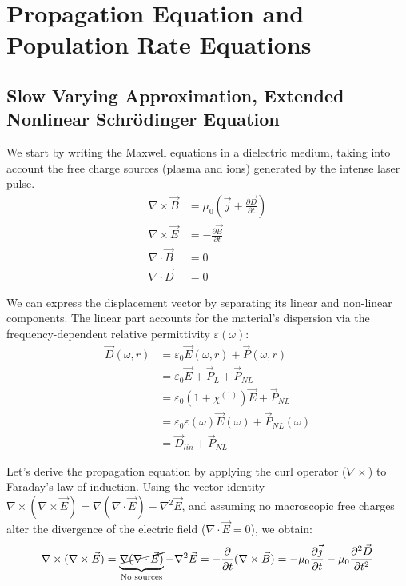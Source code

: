 \section{Propagation Equation and Population Rate Equations}
\subsection{Slow Varying Approximation, Extended Nonlinear Schrödinger Equation}

We start by writing the Maxwell equations in a dielectric medium, taking into account the free charge sources (plasma and ions) generated by the intense laser pulse.
\begin{align}
\nabla \times \vec{B} &= \mu_0 \left( \vec{j} + \frac{\partial \vec{D}}{\partial t} \right) \\
\nabla \times \vec{E} &= -\frac{\partial \vec{B}}{\partial t} \\
\nabla \cdot \vec{B} &= 0 \\
\nabla \cdot \vec{D} &= 0 \quad
\end{align}

We can express the displacement vector by separating its linear and non-linear components. The linear part accounts for the material's dispersion via the frequency-dependent relative permittivity $\varepsilon(\omega)$:
\begin{align}
\vec{D}(\omega, r) &= \varepsilon_0 \vec{E}(\omega, r) + \vec{P}(\omega, r) \nonumber \\
&= \varepsilon_0 \vec{E} + \vec{P}_L + \vec{P}_{NL} \nonumber \\
&= \varepsilon_0 \left(1 + \chi^{(1)}\right) \vec{E} + \vec{P}_{NL} \nonumber \\
&= \varepsilon_0 \varepsilon(\omega) \vec{E}(\omega) + \vec{P}_{NL}(\omega) \nonumber \\
&= \vec{D}_{lin} + \vec{P}_{NL}
\end{align}

Let's derive the propagation equation by applying the curl operator ($\nabla \times$) to Faraday's law of induction. Using the vector identity $\nabla \times (\nabla \times \vec{E}) = \nabla(\nabla \cdot \vec{E}) - \nabla^2 \vec{E}$, and assuming no macroscopic free charges alter the divergence of the electric field ($\nabla \cdot \vec{E} = 0$), we obtain:
\begin{equation}
\nabla \times (\nabla \times \vec{E}) = \underbrace{\cancel{\nabla(\nabla \cdot \vec{E})}}_{\text{No sources}} - \nabla^2 \vec{E} = -\frac{\partial}{\partial t} (\nabla \times \vec{B}) = -\mu_0 \frac{\partial \vec{j}}{\partial t} - \mu_0 \frac{\partial^2 \vec{D}}{\partial t^2}
\end{equation}

